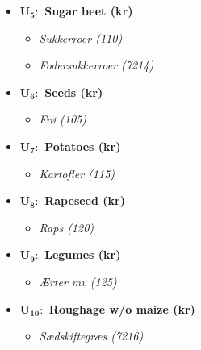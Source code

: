 \documentclass[12pt]{article}
\begin{document}
\begin{itemize}
    \begin{itemize}
        \item[$+$] \textit{Rug, ultimo (7082)}
        \item[$+$] \textit{Rug, kasseomsætning (7090)}
        \item[$+$] \textit{Rug, intern omsætning} (7045)
        \item[$-$] \textit{Rug, primo (7080)} 
        \item[$+$] \textit{Triticale, ultimo (7097)}
        \item[$+$] \textit{Triticale, kasseomsætning (7010)}
        \item[$+$] \textit{Triticale, intern omsætning (7038)}
        \item[$-$] \textit{Triticale, primo (7095)}
    \end{itemize}
    \item[] \textbf{U$_\textbf{5}:$ Sugar beet (kr)}
    \begin{itemize}
        \item[$+$] \textit{Sukkerroer (110)}
        \item[$+$] \textit{Fodersukkerroer (7214)}
    \end{itemize}
    \item[] \textbf{U$_\textbf{6}:$ Seeds (kr)}
    \begin{itemize}
        \item[$+$] \textit{Frø (105)}
    \end{itemize}
    \item[] \textbf{U$_\textbf{7}:$ Potatoes (kr)}
    \begin{itemize}
        \item[$+$] \textit{Kartofler (115)}
    \end{itemize}
    \item[] \textbf{U$_\textbf{8}:$ Rapeseed (kr)}
    \begin{itemize}
        \item[$+$] \textit{Raps (120)}
    \end{itemize}
    \item[] \textbf{U$_\textbf{9}:$ Legumes (kr)}
    \begin{itemize}
        \item[$+$] \textit{Ærter mv (125)}
    \end{itemize}
    \item[] \textbf{U$_{\textbf{10}}:$ Roughage w/o maize (kr)}
    \begin{itemize}
        \item[$+$] \textit{Sædskiftegræs (7216)}

\end{itemize}
\end{itemize}
\end{document}
